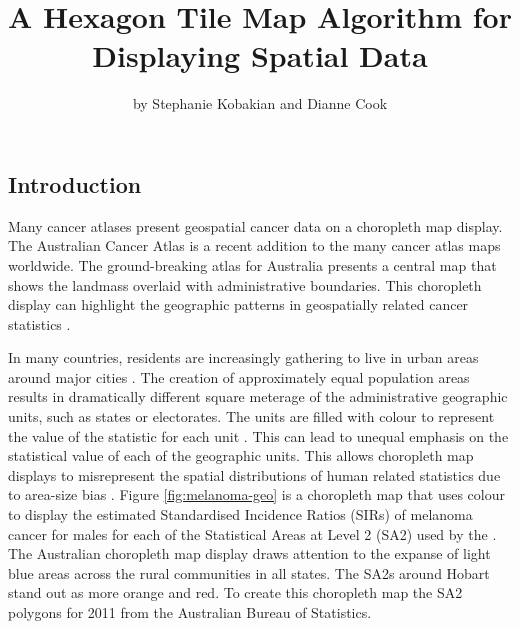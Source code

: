 \title{A Hexagon Tile Map Algorithm for Displaying Spatial Data}
\author{by Stephanie Kobakian and Dianne Cook}

\maketitle


\hypertarget{introduction}{%
\subsection{Introduction}\label{introduction}}

Many cancer atlases present geospatial cancer data on a choropleth map
display. The Australian Cancer Atlas \citep{TACA} is a recent addition
to the many cancer atlas maps worldwide. The ground-breaking atlas for
Australia presents a central map that shows the landmass overlaid with
administrative boundaries. This choropleth display can highlight the
geographic patterns in geospatially related cancer statistics
\citep{SAMGIS}.

In many countries, residents are increasingly gathering to live in urban
areas around major cities \citep{ACTUC}. The creation of approximately
equal population areas results in dramatically different square meterage
of the administrative geographic units, such as states or electorates.
The units are filled with colour to represent the value of the statistic
for each unit \citep{EI}. This can lead to unequal emphasis on the
statistical value of each of the geographic units. This allows
choropleth map displays to misrepresent the spatial distributions of
human related statistics due to area-size bias \citep{BCM}. Figure
\ref{fig:melanoma-geo} is a choropleth map that uses colour to display
the estimated Standardised Incidence Ratios (SIRs) of melanoma cancer
for males for each of the Statistical Areas at Level 2 (SA2) used by the
\citet{abs2011}. The Australian choropleth map display draws attention
to the expanse of light blue areas across the rural communities in all
states. The SA2s around Hobart stand out as more orange and red. To
create this choropleth map the SA2 polygons for 2011 from the Australian
Bureau of Statistics.

